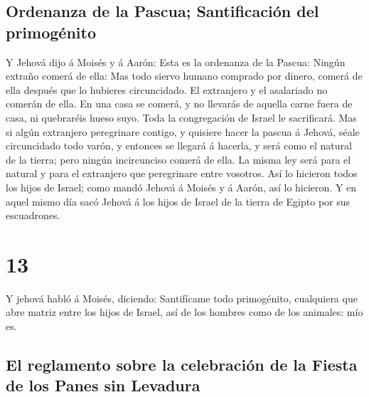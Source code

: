 \hypertarget{ordenanza-de-la-pascua-santificaciuxf3n-del-primoguxe9nito}{%
\subsection{Ordenanza de la Pascua; Santificación del
primogénito}\label{ordenanza-de-la-pascua-santificaciuxf3n-del-primoguxe9nito}}

 Y Jehová dijo á Moisés y á Aarón: Esta es la ordenanza de
la Pascua: Ningún extraño comerá de ella:  Mas todo siervo
humano comprado por dinero, comerá de ella después que lo hubieres
circuncidado.  El extranjero y el asalariado no comerán de
ella.  En una casa se comerá, y no llevarás de aquella
carne fuera de casa, ni quebraréis hueso suyo.  Toda la
congregación de Israel le sacrificará.  Mas si algún
extranjero peregrinare contigo, y quisiere hacer la pascua á Jehová,
séale circuncidado todo varón, y entonces se llegará á hacerla, y será
como el natural de la tierra; pero ningún incircunciso comerá de ella.
 La misma ley será para el natural y para el extranjero que
peregrinare entre vosotros.  Así lo hicieron todos los
hijos de Israel; como mandó Jehová á Moisés y á Aarón, así lo hicieron.
 Y en aquel mismo día sacó Jehová á los hijos de Israel de
la tierra de Egipto por sus escuadrones.

\hypertarget{section-12}{%
\section{13}\label{section-12}}

 Y jehová habló á Moisés, diciendo:  Santifícame
todo primogénito, cualquiera que abre matriz entre los hijos de Israel,
así de los hombres como de los animales: mío es.

\hypertarget{el-reglamento-sobre-la-celebraciuxf3n-de-la-fiesta-de-los-panes-sin-levadura}{%
\subsection{El reglamento sobre la celebración de la Fiesta de los Panes
sin
Levadura}\label{el-reglamento-sobre-la-celebraciuxf3n-de-la-fiesta-de-los-panes-sin-levadura}}

